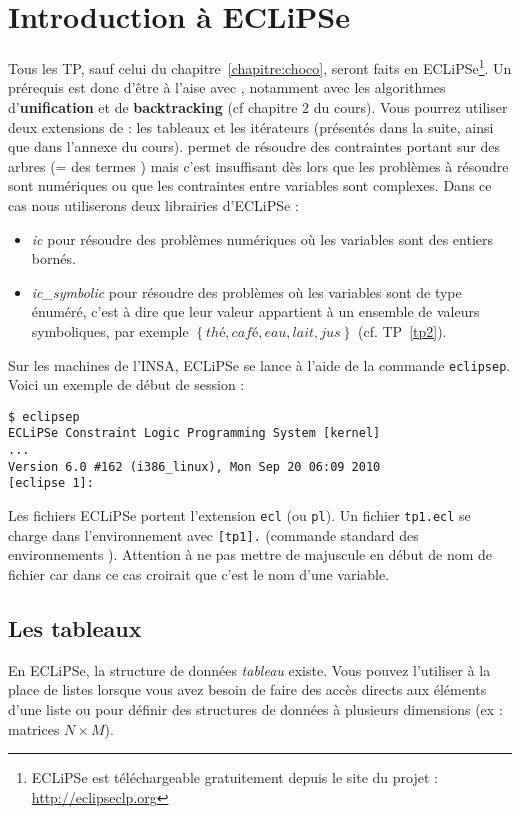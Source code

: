\chapter*{Introduction à ECLiPSe \prolog}

Tous les TP, sauf celui du chapitre~\ref{chapitre:choco}, seront faits
en ECLiPSe\footnote{ECLiPSe est téléchargeable gratuitement depuis le
  site du projet : \url{http://eclipseclp.org}}. Un prérequis est donc
d'être à l'aise avec \prolog, notamment avec les algorithmes
d'\textbf{unification} et de \textbf{backtracking} (cf chapitre 2 du
cours).  Vous pourrez utiliser deux extensions de \prolog: les
tableaux et les itérateurs (présentés dans la suite, ainsi que dans
l'annexe du cours). \prolog{} permet de résoudre des contraintes
portant sur des arbres (= des termes \prolog) mais c'est insuffisant
dès lors que les problèmes à résoudre sont numériques ou que les
contraintes entre variables sont complexes. Dans ce cas nous
utiliserons deux librairies d'ECLiPSe :
\begin{itemize}
\item \emph{ic} pour résoudre des problèmes numériques où les
  variables sont des entiers bornés.
\item \emph{ic\_symbolic} pour résoudre des problèmes où les variables
  sont de type énuméré, c'est à dire que leur valeur appartient à un
  ensemble de valeurs symboliques, par exemple $\left\lbrace thé,
    café, eau, lait, jus\right\rbrace$ (cf. TP~\ref{tp2}).\\
\end{itemize} 

Sur les machines de l'INSA, ECLiPSe se lance à l'aide de la commande
\texttt{eclipsep}. Voici un exemple de début de session :

\begin{verbatim}
$ eclipsep
ECLiPSe Constraint Logic Programming System [kernel]
...
Version 6.0 #162 (i386_linux), Mon Sep 20 06:09 2010
[eclipse 1]:
\end{verbatim}

Les fichiers ECLiPSe portent l'extension \texttt{ecl} (ou  \texttt{pl}).
Un fichier \texttt{tp1.ecl} se charge dans l'environnement avec \og
\texttt{[tp1].} {\fg} (commande standard des environnements
\prolog). Attention à ne pas mettre de majuscule en début de nom de
fichier car dans ce cas \prolog{} croirait que c'est le nom d'une
variable.

\section{Les tableaux}
En ECLiPSe, la structure de données \textit{tableau} existe. Vous
pouvez l'utiliser à la place de listes lorsque vous avez besoin de
faire des accès directs aux éléments d'une liste ou pour définir des
structures de données à plusieurs dimensions (ex : matrices $N \times
M$).


